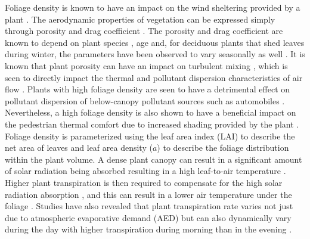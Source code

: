 Foliage density is known to have an impact on the wind sheltering provided by a plant \citep{Bitog2012b,Bitog2011b,Guan2003,Manickathan2018b}. The aerodynamic properties of vegetation can be expressed simply through porosity and drag coefficient \citep{Grant1998,Guan2003,Manickathan2018b}. The porosity and drag coefficient are known to depend on plant species \citep{Cao2012,Manickathan2018b,Rudnicki2004,Vollsinger2005}, age \citep{Dahle2010} and, for deciduous plants that shed leaves during winter, the parameters have been observed to vary seasonally as well \citep{Dellwik2019,Hwang2011,Maass1995}. It is known that plant porosity can have an impact on turbulent mixing \citep{Bai2012,Hiraoka2008,Manickathan2018b,McClure2017}, which is seen to directly impact the thermal and pollutant dispersion characteristics of air flow \citep{Conan2015,Gromke2008,Gromke2015c,Gromke2008a}. Plants with high foliage density are seen to have a detrimental effect on pollutant dispersion of below-canopy pollutant sources such as automobiles \citep{Nowak2006}. Nevertheless, a high foliage density is also shown to have a beneficial impact on the pedestrian thermal comfort due to increased shading provided by the plant \citep{Hwang2011,Morakinyo2017,Ng2012}. Foliage density is parameterized using the leaf area index (LAI) to describe the net area of leaves and leaf area density ($a$) to describe the foliage distribution within the plant volume. A dense plant canopy can result in a significant amount of solar radiation being absorbed resulting in a high leaf-to-air temperature \citep{Hiraoka2005,Leuzinger2007,Manickathan2018a}. Higher plant transpiration is then required to compensate for the high solar radiation absorption \citep{Manickathan2018b}, and this can result in a lower air temperature under the foliage \citep{Wong2003}. Studies have also revealed that plant transpiration rate varies not just due to atmospheric evaporative demand (AED) \citep{Kichah2012,Manickathan2018a,McVicar2012,Tuzet2003} but can also dynamically vary during the day with higher transpiration during morning than in the evening \citep{Huang2017,Tuzet2003}.

	
